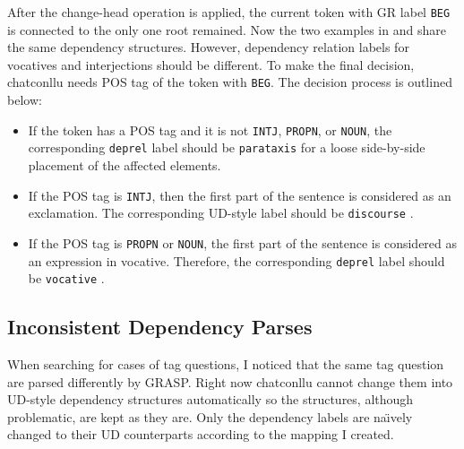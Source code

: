 After the change-head operation is applied, the current token with GR label \texttt{BEG} is connected to the only one root remained. Now the two examples in  and  share the same dependency structures. However, dependency relation labels for vocatives and interjections should be different. To make the final decision, chatconllu needs POS tag of the token with \texttt{BEG}. The decision process is outlined below:\\

\begin{itemize}
    \item If the token has a POS tag and it is not \texttt{INTJ}, \texttt{PROPN}, or \texttt{NOUN}, the corresponding \texttt{deprel}  label should be \texttt{parataxis} for a loose side-by-side placement of the affected elements.
    \item If the POS tag is \texttt{INTJ}, then the first part of the sentence is considered as an exclamation. The corresponding UD-style label should be \texttt{discourse} .
    \item If the POS tag is \texttt{PROPN} or \texttt{NOUN}, the first part of the sentence is considered as an expression in vocative. Therefore, the corresponding \texttt{deprel} label should be \texttt{vocative} .
\end{itemize}

\subsection{Inconsistent Dependency Parses}

When searching for cases of tag questions, I noticed that the same tag question are parsed differently by GRASP. Right now chatconllu cannot change them into UD-style dependency structures automatically so the structures, although problematic, are kept as they are. Only the dependency labels are na\"{\i}vely changed to their UD counterparts according to the mapping I created. \\

